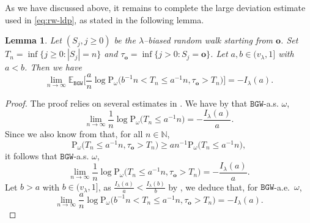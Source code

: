 \documentclass[11 pt]{article}
\newtheorem{lemma}[theorem]{Lemma}
\theoremstyle{definition}
\numberwithin{equation}{section}
\newcommand{\EE}{\mathbb{E}} %
\newcommand{\rt}{\mathbf{o}} %
\newcommand{\Pws}{\mathrm{P}_{\omega}} %
\begin{document}
As we have discussed above, it remains to complete the large deviation estimate used in \eqref{eq:rw-ldp}, as stated in the following lemma. 
\begin{lemma}\label{lem:log0-bis}
	Let $(S_j, j\ge 0)$ be the $\lambda$--biased random walk starting from $\rt$. Set $T_n = \inf\{j\ge 0\colon |S_j|=n  \}$ and $\tau_{\rt} = \inf\{j > 0\colon S_j = \rt  \}$. 
	Let $a,b\in (v_{\lambda}, 1]$ with $a<b$. 
	Then we have 
	\begin{equation*}
		\lim_{n\to \infty} \EE_{\mathtt{BGW}}  \Big[ \frac{a}{n}\log  \Pws\big( b^{-1} n< T_{n} \le a^{-1}  n, \tau_\rt >T_{n}  \big)  \Big]  = - I_{\lambda}(a). 
	\end{equation*}
\end{lemma}
\begin{proof}
	The proof relies on several estimates in \cite{DGPZ-ld}.  
	We have by \cite[(4.7) and (4.10)]{DGPZ-ld} that $\mathtt{BGW}$-a.s. $\omega$, 
	\[
	\lim_{n\to \infty} \frac{1}{n}\log\Pws\big(T_{n} \le a^{-1}  n\big) =- \frac{I_{\lambda}(a)}{a}.
	\]
	Since we also know from \cite[(4.5)]{DGPZ-ld} that, for all $n\in \mathbb{N}$, 
	\[
	\Pws\big( T_{n} \le a^{-1}  n, \tau_\rt >T_{n}  \big)
	\ge a n^{-1} \Pws\big( T_{n} \le a^{-1}  n  \big), 
	\]
	it follows that  $\mathtt{BGW}$-a.s. $\omega$, 
	\begin{equation*}
		\lim_{n\to \infty} \frac{1}{n}\log\Pws\big(T_{n} \le a^{-1}  n, \tau_\rt >T_{n}\big) =- \frac{I_{\lambda}(a)}{a}. 
	\end{equation*}
Let $b>a$ with $b\in (v_{\lambda}, 1]$, as $\frac{I_{\lambda}(a)}{a}<\frac{I_{\lambda}(b)}{b}$ by \cite[Page~255]{DGPZ-ld},  we deduce that, for $\mathtt{BGW}$-a.e.\ $\omega$, 
\begin{equation}\label{eq:ld-Tn}
\lim_{n\to\infty}	\frac{a}{n} \log \Pws\big( b^{-1}n< T_{n } \le a^{-1} n, \tau_\rt >T_{n}  \big)
= -I_{\lambda} (a) . 
	\end{equation}
	

\end{proof}
\end{document}

